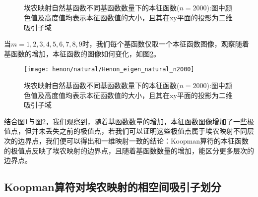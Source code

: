 \begin{figure}
    \centering
    \\
    \\
    \\
    \\
    \caption[埃农映射自然基函数不同基函数数量下的本征函数]{埃农映射自然基函数不同基函数数量下的本征函数($n=2000$):图中颜色值及高度值均表示本征函数值的大小，且其在xy平面的投影为二维吸引子域}\label{fig:Henon_eigen_natural_n2000m1}
\end{figure}

当$m=1,2,3,4,5,6,7,8,9$时，我们每个基函数仅取一个本征函数图像，观察随着基函数的增加，本征函数的图像如何变化，如图\ref{fig:Henon_eigen_natural_n2000}。

\begin{figure}
	\centering
	\texttt{[image: henon/natural/Henon\_eigen\_natural\_n2000]}
    \caption{埃农映射自然基函数不同基函数数量下的本征函数($n=2000$):图中颜色值及高度值均表示本征函数值的大小，且其在xy平面的投影为二维吸引子域}\label{fig:Henon_eigen_natural_n2000}
\end{figure}

结合图\ref{fig:Henon_eigen_natural_n2000m1}与图\ref{fig:Henon_eigen_natural_n2000}，我们观察到，随着基函数数量的增加，本征函数图像增加了一些极值点，但并未丢失之前的极值点，若我们可以证明这些极值点属于埃农映射不同层次的边界点，我们便可以得出和一维映射一致的结论：Koopman算符的本征函数的极值点反映了埃农映射的边界点，且随着基函数数量的增加，能区分更多层次的边界点。

\subsection{Koopman算符对埃农映射的相空间吸引子划分}

